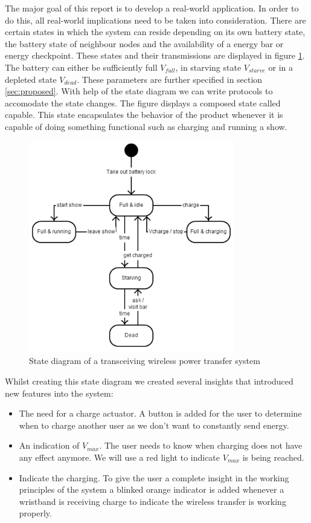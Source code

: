%
The major goal of this report is to develop a real-world application. In order to do this, all real-world implications need to be taken into consideration. There are certain states in which the system can reside depending on its own battery state, the battery state of neighbour nodes and the availability of a energy bar or energy checkpoint. These states and their transmissions are displayed in figure \ref{fig:states}. The battery can either be sufficiently full $V_{full}$, in starving state $V_{starve}$ or in a depleted state $V_{dead}$. These parameters are further specified in section \ref{sec:proposed}. With help of the state diagram we can write protocols to accomodate the state changes. The figure displays a composed state called capable. This state encapsulates the behavior of the product whenever it is capable of doing something functional such as charging and running a show. 

\begin{figure}[h!]
\centering
\includegraphics[width=0.8\textwidth]{statediagram.pdf}
\caption{State diagram of a transceiving wireless power transfer system}
\label{fig:states}
\end{figure}

Whilst creating this state diagram we created several insights that introduced new features into the system:
\begin{itemize}
	\item The need for a charge actuator. A button is added for the user to determine when to charge another user as 		we don't want to constantly send energy. 
	\item An indication of $V_{max}$. The user needs to know when charging does not have any effect anymore. We 		will use a red light to indicate $V_{max}$ is being reached. 
	\item Indicate the charging. To give the user a complete insight in the working principles of the system a blinked 		orange indicator is added whenever a wristband is receiving charge to indicate the wireless transfer is working 			properly. 
\end{itemize}

